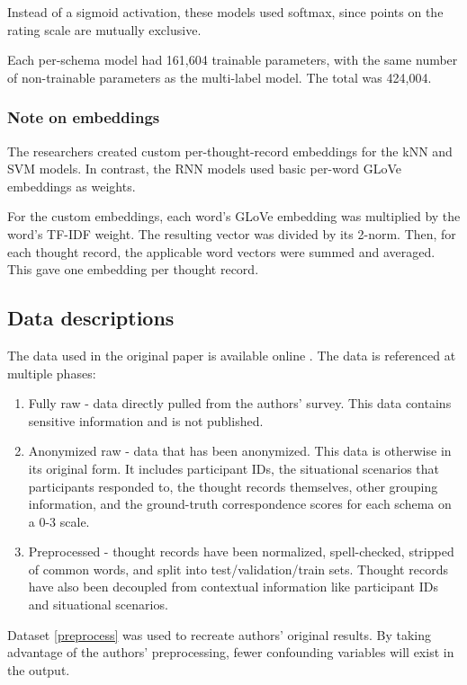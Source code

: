 \documentclass[11pt,a4paper]{article}
\begin{document}
Instead of a sigmoid activation, these models used softmax, since points on the rating scale are mutually exclusive.

Each per-schema model had 161,604 trainable parameters, with the same number of non-trainable parameters as the multi-label model. The total was 424,004.

\subsubsection{Note on embeddings}
The researchers created custom per-thought-record embeddings for the kNN and SVM models. In contrast, the RNN models used basic per-word GLoVe embeddings as weights.

For the custom embeddings, each word's GLoVe embedding was multiplied by the word's TF-IDF weight. The resulting vector was divided by its 2-norm. Then, for each thought record, the applicable word vectors were summed and averaged. This gave one embedding per thought record.

\subsection{Data descriptions}
The data used in the original paper is available online \citep{burger_2021_data}. The data is referenced at multiple phases: 
\begin{enumerate}
    \item Fully raw - data directly pulled from the authors' survey. This data contains sensitive information and is not published. 
    \item Anonymized raw - data that has been anonymized. This data is otherwise in its original form. It includes participant IDs, the situational scenarios that participants responded to, the thought records themselves, other grouping information, and the ground-truth correspondence scores for each schema on a 0-3 scale.
    \label{anon_raw}
    \item Preprocessed - thought records have been normalized, spell-checked, stripped of common words, and split into test/validation/train sets. Thought records have also been decoupled from contextual information like participant IDs and situational scenarios.
    \label{preprocess}
\end{enumerate}

Dataset \ref{preprocess} was used to recreate authors' original results. By taking advantage of the authors' preprocessing, fewer confounding variables will exist in the output. 
\end{document}
